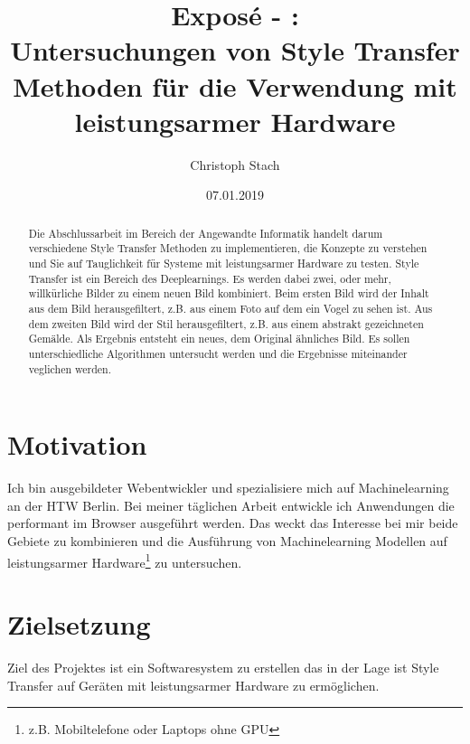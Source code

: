 


\title{\bf Exposé - \@exposeType:\protect\\ Untersuchungen von Style Transfer Methoden für die Verwendung mit leistungsarmer Hardware}
\author{Christoph Stach}
\date{07.01.2019}



\maketitle

\begin{otherlanguage}{ngerman}
	\begin{abstract}
		Die Abschlussarbeit im Bereich der Angewandte Informatik handelt darum verschiedene Style Transfer Methoden zu implementieren,
		die Konzepte zu verstehen und Sie auf Tauglichkeit für Systeme mit leistungsarmer Hardware zu testen. Style Transfer ist ein Bereich des 
		Deeplearnings. Es werden dabei zwei, oder mehr, willkürliche Bilder zu einem neuen Bild kombiniert. Beim ersten Bild wird der Inhalt aus
		dem Bild herausgefiltert, z.B. aus einem Foto auf dem ein Vogel zu sehen ist. Aus dem zweiten Bild wird der Stil herausgefiltert, 
		z.B. aus einem abstrakt gezeichneten Gemälde. Als Ergebnis entsteht ein neues, dem Original ähnliches Bild. Es sollen 
		unterschiedliche Algorithmen untersucht werden und die Ergebnisse miteinander veglichen werden.
	\end{abstract}
\end{otherlanguage}

\pagebreak

\section{Motivation}
Ich bin ausgebildeter Webentwickler und spezialisiere mich auf Machinelearning an der HTW Berlin. Bei meiner täglichen Arbeit
entwickle ich Anwendungen die performant im Browser ausgeführt werden. Das weckt das Interesse bei mir beide Gebiete zu kombinieren
und die Ausführung von Machinelearning Modellen auf leistungsarmer Hardware\footnote{z.B. Mobiltelefone oder Laptops ohne GPU} zu untersuchen.

\section{Zielsetzung}
Ziel des Projektes ist ein Softwaresystem zu erstellen das in der Lage ist
Style Transfer auf Geräten mit leistungsarmer Hardware zu ermöglichen.

